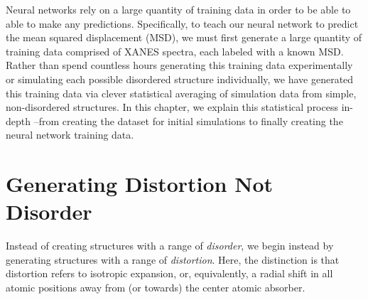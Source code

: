 
Neural networks rely on a large quantity of training data in order to be able to able to make any predictions. Specifically, to teach our neural network to predict the mean squared displacement (MSD), we must first generate a large quantity of training data comprised of XANES spectra, each labeled with a known MSD. Rather than spend countless hours generating this training data experimentally or simulating each possible disordered structure individually, we have generated this training data via clever statistical averaging of simulation data from simple, non-disordered structures. In this chapter, we explain this statistical process in-depth --from creating the dataset for initial simulations to finally creating the neural network training data.

\section{Generating Distortion Not Disorder}
Instead of creating structures with a range of \textit{disorder}, we begin instead by generating structures with a range of \textit{distortion}. Here, the distinction is that distortion refers to isotropic expansion, or, equivalently, a radial shift in all atomic positions away from (or towards) the center atomic absorber.

